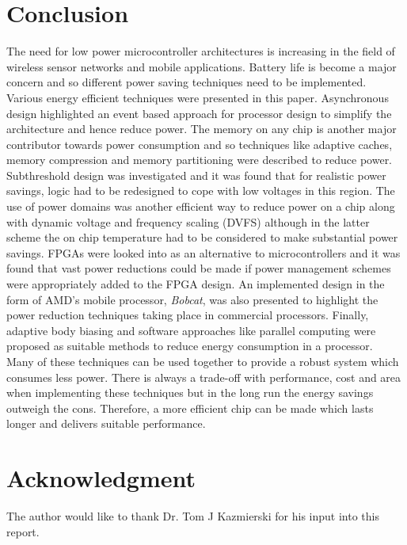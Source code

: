 \documentclass[journal]{IEEEtran}
\begin{document}
\section{Conclusion}
The need for low power microcontroller architectures is increasing in the field of wireless sensor networks and mobile applications. Battery life is become a major concern and so different power saving techniques need to be implemented. Various energy efficient techniques were presented in this paper. Asynchronous design highlighted an event based approach for processor design to simplify the architecture and hence reduce power. The memory on any chip is another major contributor towards power consumption and so techniques like adaptive caches, memory compression and memory partitioning were described to reduce power. Subthreshold design was investigated and it was found that for realistic power savings, logic had to be redesigned to cope with low voltages in this region. The use of power domains was another efficient way to reduce power on a chip along with dynamic voltage and frequency scaling (DVFS) although in the latter scheme the on chip temperature had to be considered to make substantial power savings. FPGAs were looked into as an alternative to microcontrollers and it was found that vast power reductions could be made if power management schemes were appropriately added to the FPGA design. An implemented design in the form of AMD's mobile processor, \textit{Bobcat}, was also presented to highlight the power reduction techniques taking place in commercial processors. Finally, adaptive body biasing and software approaches like parallel computing were proposed as suitable methods to reduce energy consumption in a processor. \\

Many of these techniques can be used together to provide a robust system which consumes less power. There is always a trade-off with performance, cost and area when implementing these techniques but in the long run the energy savings outweigh the cons. Therefore, a more efficient chip can be made which lasts longer and delivers suitable performance.


\appendices

\section*{Acknowledgment}
The author would like to thank Dr. Tom J Kazmierski for his input into this report.


\ifCLASSOPTIONcaptionsoff
  \newpage
\fi




\end{document}
